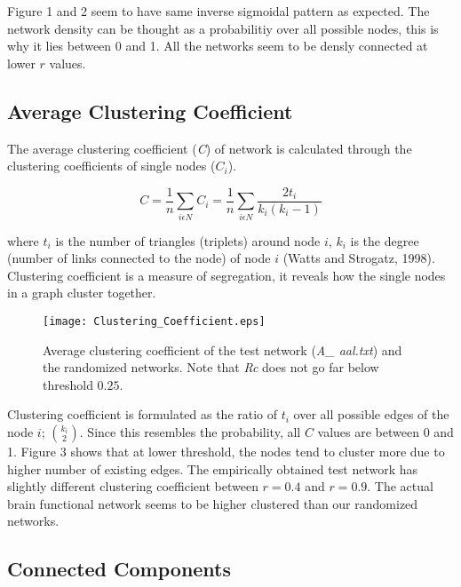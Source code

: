 \documentclass[12pt]{article}
\begin{document}
Figure 1 and 2 seem to have same inverse sigmoidal pattern as expected. The network density can be thought as a probabilitiy over all possible nodes, this is why it lies between 0 and 1. All the networks seem to be densly connected at lower $r$ values.
 
\newpage

\subsection{Average Clustering Coefficient}

The average clustering coefficient (\textit{C}) of network is calculated through the clustering coefficients of single nodes ($C_i$).

\begin{equation}
C = \frac{1}{n} \sum\limits_{i\epsilon N}C_i = \frac{1}{n}\sum\limits_{i\epsilon N} \frac{2t_i}{k_i(k_i -1)}
\end{equation} 

where $t_i$ is the number of triangles (triplets) around node $i$, $k_i$ is the degree (number of links connected to the node) of node $i$ (Watts and Strogatz, 1998). Clustering coefficient is a measure of segregation, it reveals how the single nodes in a graph cluster together.

\begin{figure}[h!]
	
	\centering
	\texttt{[image: Clustering\_Coefficient.eps]}
	\caption{Average clustering coefficient of the test network (\textit{A\_ aal.txt}) and the randomized networks. Note that \textit{Rc} does not go far below threshold $0.25$.}
\end{figure}

Clustering coefficient is formulated as the ratio of $t_i$ over all possible edges of the node $i$; ${k_i \choose 2} $. Since this resembles the probability, all $C$ values are between 0 and 1. Figure 3 shows that at lower threshold, the nodes tend to cluster more due to higher number of existing edges. The empirically obtained test network has slightly different clustering coefficient between $r=0.4$ and $r=0.9$. The actual brain functional network seems to be higher clustered than our randomized networks.	

\newpage

\subsection{Connected Components}
\end{document}
